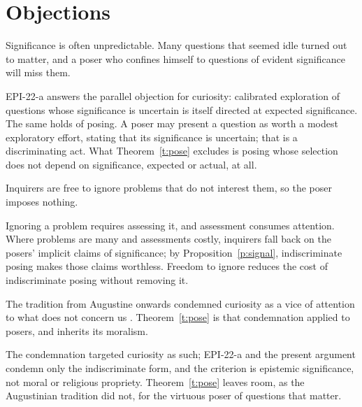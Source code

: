\documentclass{situationist-preprint}
\begin{document}
\section{Objections}

\begin{objection}
Significance is often unpredictable. Many questions that seemed idle turned out to matter, and a poser who confines himself to questions of evident significance will miss them.
\end{objection}

\begin{reply}
EPI-22-a answers the parallel objection for curiosity: calibrated exploration of questions whose significance is uncertain is itself directed at expected significance. The same holds of posing. A poser may present a question as worth a modest exploratory effort, stating that its significance is uncertain; that is a discriminating act. What Theorem~\ref{t:pose} excludes is posing whose selection does not depend on significance, expected or actual, at all.
\end{reply}

\begin{objection}
Inquirers are free to ignore problems that do not interest them, so the poser imposes nothing.
\end{objection}

\begin{reply}
Ignoring a problem requires assessing it, and assessment consumes attention. Where problems are many and assessments costly, inquirers fall back on the posers' implicit claims of significance; by Proposition~\ref{p:signal}, indiscriminate posing makes those claims worthless. Freedom to ignore reduces the cost of indiscriminate posing without removing it.
\end{reply}

\begin{objection}
The tradition from Augustine onwards condemned curiosity as a vice of attention to what does not concern us \citep[X.35]{AugustineConf}. Theorem~\ref{t:pose} is that condemnation applied to posers, and inherits its moralism.
\end{objection}

\begin{reply}
The condemnation targeted curiosity as such; EPI-22-a and the present argument condemn only the indiscriminate form, and the criterion is epistemic significance, not moral or religious propriety. Theorem~\ref{t:pose} leaves room, as the Augustinian tradition did not, for the virtuous poser of questions that matter.
\end{reply}
\end{document}
